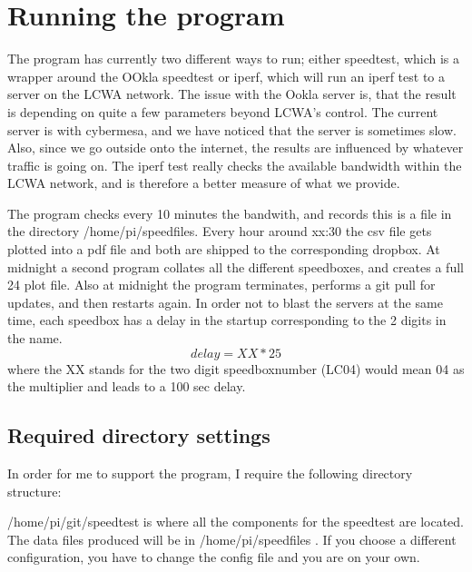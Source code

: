 \documentclass[11pt]{article}
\begin{document}
\section{Running  the program}

The program has currently two different ways to run; either speedtest, which is a wrapper around the OOkla speedtest  or iperf, which will run an iperf test to a server on the LCWA network. The issue with the Ookla server is, that the result is depending on quite a few parameters beyond LCWA's control. The current server is with cybermesa,
and we have noticed that the server is sometimes slow. Also, since we go outside onto the internet, the results are  influenced by whatever traffic is going on. The iperf test really checks the available bandwidth within the LCWA network, and is therefore a better measure of what we provide.

The program checks every 10 minutes the bandwith, and records this is a file in the directory /home/pi/speedfiles. Every hour around xx:30 the csv file gets plotted into a pdf file and both are shipped to the corresponding dropbox.
At midnight a second program collates all the different speedboxes, and creates a full 24 plot file. Also at midnight the program terminates, performs a git pull for updates, and then restarts again. In order not to blast the servers at the same time, each speedbox has a delay in the startup corresponding to the 2 digits in the name.
\begin{equation}
delay = XX*25
\end{equation}
where the XX stands for the two digit speedboxnumber (LC04) would mean 04  as the multiplier and leads to a 100 sec delay.

\subsection{Required directory settings}

In order for me to support the program, I require the following directory structure:

/home/pi/git/speedtest is where all the components for the speedtest are located. The data files produced will be in /home/pi/speedfiles . If you choose a different configuration, you have to change the config file and you are on your own.
 
\end{document}
